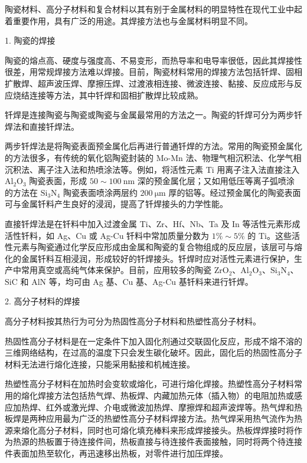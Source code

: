 \documentclass[UTF8]{ctexbook}
\newcommand{\◎}{\ensuremath{\bigcirc}}
\begin{document}
陶瓷材料、高分子材料和复合材料以其有别于金属材料的明显特性在现代工业中起着重要作用，具有广泛的用途。其焊接方法也与金属材料明显不同。

1. 陶瓷的焊接

陶瓷的熔点高、硬度与强度高、不易变形，而热导率和电导率很低，因此其焊接性很差，用常规焊接方法难以焊接。目前，陶瓷材料常用的焊接方法包括钎焊、固相扩散焊、超声波压焊、摩擦压焊、过渡液相连接、微波连接、黏接、反应成形与反应烧结连接等方法，其中钎焊和固相扩散焊比较成熟。

钎焊是连接陶瓷与陶瓷或陶瓷与金属最常用的方法之一。陶瓷的钎焊可分为两步钎焊法和直接钎焊法。

两步钎焊法是将陶瓷表面预金属化后再进行普通钎焊的方法。常用的陶瓷预金属化的方法很多，有传统的氧化铝陶瓷封装的 Mo-Mn 法、物理气相沉积法、化学气相沉积法、离子注入法和热喷涂法等。例如，将活性元素 Ti 用离子注入法直接注入 $\mathrm{Al}_{2}\mathrm{O}_{3}$ 陶瓷表面，形成 $50 \sim 100 \mathrm{~nm}$ 深的预金属化层；又如用低压等离子弧喷涂的方法在 $\mathrm{Si}_{3}\mathrm{N}_{4}$ 陶瓷表面喷涂两层约 $200 \mathrm{~\mu m}$ 厚的铝等。经过预金属化的陶瓷表面可与金属钎料产生良好的浸润，提高了钎焊接头的力学性能。

直接钎焊法是在钎料中加入过渡金属 Ti、Zr、Hf、Nb、Ta 及 In 等活性元素形成活性钎料，如 Ag、Cu 或 Ag-Cu 钎料中常加质量分数为 $1 \% \sim 5 \%$ 的 Ti。这些活性元素与陶瓷通过化学反应形成由金属和陶瓷的复合物组成的反应层，该层可与熔化的金属钎料互相浸润，形成较好的钎焊接头。钎焊时应对活性元素进行保护，生产中常用真空或高纯气体来保护。目前，应用较多的陶瓷 $\mathrm{ZrO}_{2}$、$\mathrm{Al}_{2}\mathrm{O}_{3}$、$\mathrm{Si}_{3}\mathrm{N}_{4}$、$\mathrm{SiC}$ 和 AlN 等，均可由 Ag 基、Cu 基、Ag-Cu 基钎料来进行钎焊。

2. 高分子材料的焊接

高分子材料按其热行为可分为热固性高分子材料和热塑性高分子材料。

热固性高分子材料是在一定条件下加入固化剂通过交联固化反应，形成不熔不溶的三维网络结构，在过高的温度下只会发生碳化破坏。因此，固化后的热固性高分子材料无法进行熔化连接，只能采用黏接和机械连接。

热塑性高分子材料在加热时会变软或熔化，可进行熔化焊接。热塑性高分子材料常用的熔化焊接方法包括热气焊、热板焊、内藏加热元体（插入物）的电阻加热或感应加热焊、红外或激光焊、介电或微波加热焊、摩擦焊和超声波焊等。热气焊和热板焊是两种应用最为广泛的热塑性高分子材料焊接方法。热气焊采用热气流作为热源来熔化高分子材料，同时也可熔化填充棒料来形成焊接接头。热板焊焊接时将作为热源的热板置于待连接件间，热板直接与待连接件表面接触，同时将两个待连接件表面加热至软化，再迅速移出热板，对零件进行加压焊接。
\end{document}
